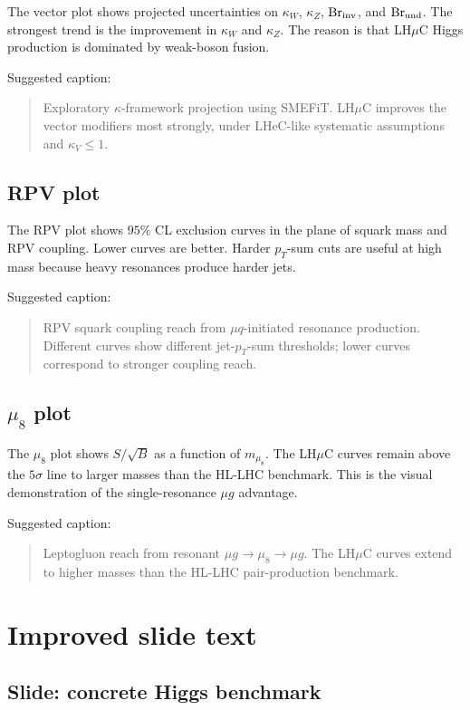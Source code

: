 \documentclass[11pt,a4paper]{article}
\newcommand{\LHmuC}{LH\ensuremath{\mu}C}
\begin{document}
The vector plot shows projected uncertainties on \(\kappa_W\), \(\kappa_Z\), \({\rm Br}_{\rm inv}\),
and \({\rm Br}_{\rm und}\).  The strongest trend is the improvement in \(\kappa_W\) and
\(\kappa_Z\).  The reason is that \LHmuC{} Higgs production is dominated by weak-boson fusion.

Suggested caption:
\begin{quote}
Exploratory \(\kappa\)-framework projection using SMEFiT.  \LHmuC{} improves the vector
modifiers most strongly, under LHeC-like systematic assumptions and \(\kappa_V\le1\).
\end{quote}

\subsection{RPV plot}

The RPV plot shows \(95\%\) CL exclusion curves in the plane of squark mass and RPV coupling.
Lower curves are better.  Harder \(p_T\)-sum cuts are useful at high mass because heavy
resonances produce harder jets.

Suggested caption:
\begin{quote}
RPV squark coupling reach from \(\mu q\)-initiated resonance production.  Different curves
show different jet-\(p_T\)-sum thresholds; lower curves correspond to stronger coupling reach.
\end{quote}

\subsection{\(\mu_8\) plot}

The \(\mu_8\) plot shows \(S/\sqrt{B}\) as a function of \(m_{\mu_8}\).  The \LHmuC{} curves
remain above the \(5\sigma\) line to larger masses than the HL-LHC benchmark.  This is the
visual demonstration of the single-resonance \(\mu g\) advantage.

Suggested caption:
\begin{quote}
Leptogluon reach from resonant \(\mu g\to\mu_8\to\mu g\).  The \LHmuC{} curves extend to
higher masses than the HL-LHC pair-production benchmark.
\end{quote}

\section{Improved slide text}

\subsection{Slide: concrete Higgs benchmark}
\end{document}
